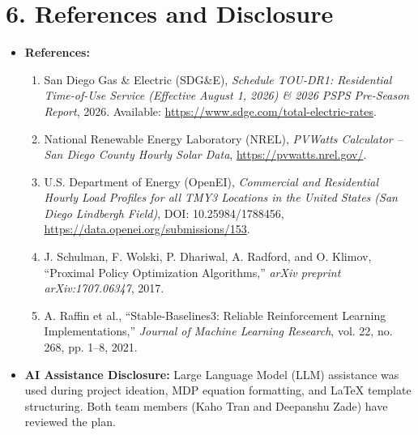 \documentclass[11pt,letterpaper]{article}
\begin{document}
\section*{6. References and Disclosure}
\begin{itemize}
  \item \textbf{References:}
  \begin{enumerate}
    \item San Diego Gas \& Electric (SDG\&E), \emph{Schedule TOU-DR1: Residential Time-of-Use Service (Effective August 1, 2026) \& 2026 PSPS Pre-Season Report}, 2026. Available: \url{https://www.sdge.com/total-electric-rates}.
    \item National Renewable Energy Laboratory (NREL), \emph{PVWatts Calculator -- San Diego County Hourly Solar Data}, \url{https://pvwatts.nrel.gov/}.
    \item U.S. Department of Energy (OpenEI), \emph{Commercial and Residential Hourly Load Profiles for all TMY3 Locations in the United States (San Diego Lindbergh Field)}, DOI: 10.25984/1788456, \url{https://data.openei.org/submissions/153}.
    \item J. Schulman, F. Wolski, P. Dhariwal, A. Radford, and O. Klimov, ``Proximal Policy Optimization Algorithms,'' \emph{arXiv preprint arXiv:1707.06347}, 2017.
    \item A. Raffin et al., ``Stable-Baselines3: Reliable Reinforcement Learning Implementations,'' \emph{Journal of Machine Learning Research}, vol. 22, no. 268, pp. 1--8, 2021.
  \end{enumerate}
  \item \textbf{AI Assistance Disclosure:} Large Language Model (LLM) assistance was used during project ideation, MDP equation formatting, and LaTeX template structuring. Both team members (Kaho Tran and Deepanshu Zade) have reviewed the plan.
\end{itemize}
\end{document}
